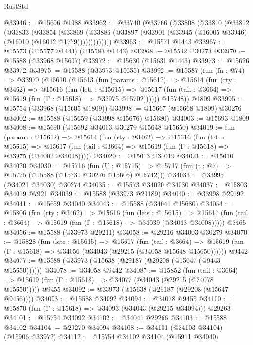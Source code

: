 \begin{lexlean}{RustStd}
\begin{coremodule}
@33946 := @15696 @1988
@33962 := @33740
    (@33766
      (@33808
        (@33810
          (@33812
            (@33833
              (@33854
                (@33869
                  (@33886 (@33897 (@33901 (@33945 (@16005 @33946) (@16010 (@16012 @1779)))))))))))))
@33963 := @15571 @1443
@33967 := @15573 (@15577 @1443) (@15583 @1443)
@33968 := @15592 @30273
@33970 := @15588 (@33968 @15607)
@33972 := @15630 (@15631 @1443)
@33973 := @15626 @33972
@33975 := @15588 (@33973 @15655)
@33992 := @15587
    (fun (fn : @74) =>
    @33970
      (@15610
        (@15613
          (fun (params : @15612) =>
          @15614
            (fun (rty : @3462) =>
            @15616
              (fun (lets : @15615) =>
              @15617 (fun (tail : @3664) => @15619 (fun (Γ : @15618) => @33975 @15702))))))
        @15748))
    @1809
@33995 := @15754 (@33968 (@15605 @1809))
@33998 := @15667 (@15668 @1809) @30276
@34002 := @15588 (@15659 (@33998 @15676) @15680)
@34003 := @15693 @1809
@34008 := @15690 (@15692 @34003 @30279 @15648 @15650)
@34019 := fun (params : @15612) =>
  @15614
    (fun (rty : @3462) =>
    @15616
      (fun (lets : @15615) =>
      @15617 (fun (tail : @3664) => @15619 (fun (Γ : @15618) => @33975 (@34002 @34008)))))
@34020 := @15613 @34019
@34021 := @15610 @34020
@34030 := @15716
    (fun (U : @15715) => @15717 (fun (t : @7) => @15725 (@15588 (@15731 @30276 @15606) @15742)))
@34033 := @33995 (@34021 @34030) @30274
@34035 := @15573 @34020 @34030
@34037 := @15803 @34019 @7921
@34039 := @15588 (@33973 @29189)
@34040 := @33998 @29192
@34041 := @15659 @34040
@34043 := @15588 (@34041 @15680)
@34054 := @15806
    (fun (rty : @3462) =>
    @15616
      (fun (lets : @15615) =>
      @15617 (fun (tail : @3664) => @15619 (fun (Γ : @15618) => @34039 (@34043 @34008)))))
    @3465
@34056 := @15588 (@33973 @29211)
@34058 := @29216 @34003 @30279
@34070 := @15828
    (fun (lets : @15615) =>
    @15617
      (fun (tail : @3664) =>
      @15619 (fun (Γ : @15618) => @34056 (@34043 (@29215 (@34058 @15648 @15650))))))
    @9442
@34077 := @15588 (@33973 (@15638 (@29187 (@29208 (@15647 (@9443 @15650))))))
@34078 := @34058 @9442
@34087 := @15852
    (fun (tail : @3664) => @15619 (fun (Γ : @15618) => @34077 (@34043 (@29215 (@34078 @15650)))))
    @9455
@34092 := @33973 (@15638 (@29187 (@29208 (@15647 @9456))))
@34093 := @15588 @34092
@34094 := @34078 @9455
@34100 := @15870 (fun (Γ : @15618) => @34093 (@34043 (@29215 @34094))) @29263
@34101 := @15754 @34092
@34102 := @34041 @29266
@34103 := @15588 @34102
@34104 := @29270 @34094
@34108 := @34101 (@34103 @34104) (@15906 @33972)
@34112 := @15754 @34102 @34104 (@15911 @34040)

\end{coremodule}
\end{lexlean}
